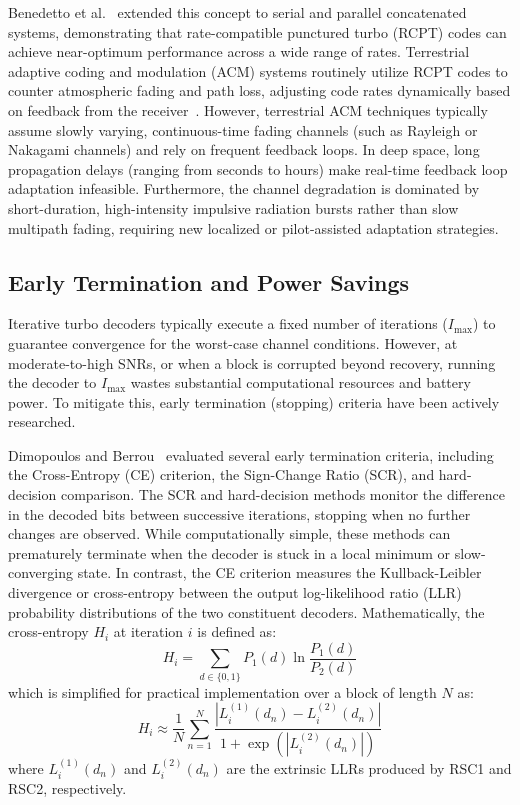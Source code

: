 \documentclass[journal,twocolumn]{IEEEtran}
\begin{document}
Benedetto et al.~\cite{benedetto1997punctured} extended this concept to serial and parallel concatenated systems, demonstrating that rate-compatible punctured turbo (RCPT) codes can achieve near-optimum performance across a wide range of rates. Terrestrial adaptive coding and modulation (ACM) systems routinely utilize RCPT codes to counter atmospheric fading and path loss, adjusting code rates dynamically based on feedback from the receiver~\cite{fazel2003adaptive}. However, terrestrial ACM techniques typically assume slowly varying, continuous-time fading channels (such as Rayleigh or Nakagami channels) and rely on frequent feedback loops. In deep space, long propagation delays (ranging from seconds to hours) make real-time feedback loop adaptation infeasible. Furthermore, the channel degradation is dominated by short-duration, high-intensity impulsive radiation bursts rather than slow multipath fading, requiring new localized or pilot-assisted adaptation strategies.

\subsection{Early Termination and Power Savings}
Iterative turbo decoders typically execute a fixed number of iterations ($I_{\max}$) to guarantee convergence for the worst-case channel conditions. However, at moderate-to-high SNRs, or when a block is corrupted beyond recovery, running the decoder to $I_{\max}$ wastes substantial computational resources and battery power. To mitigate this, early termination (stopping) criteria have been actively researched.

Dimopoulos and Berrou~\cite{dimopoulosDET} evaluated several early termination criteria, including the Cross-Entropy (CE) criterion, the Sign-Change Ratio (SCR), and hard-decision comparison. The SCR and hard-decision methods monitor the difference in the decoded bits between successive iterations, stopping when no further changes are observed. While computationally simple, these methods can prematurely terminate when the decoder is stuck in a local minimum or slow-converging state. In contrast, the CE criterion measures the Kullback-Leibler divergence or cross-entropy between the output log-likelihood ratio (LLR) probability distributions of the two constituent decoders. Mathematically, the cross-entropy $H_i$ at iteration $i$ is defined as:
\begin{equation}
  H_i = \sum_{d \in \{0,1\}} P_1(d) \ln \frac{P_1(d)}{P_2(d)}
\end{equation}
which is simplified for practical implementation over a block of length $N$ as:
\begin{equation}
  H_i \approx \frac{1}{N} \sum_{n=1}^N \frac{|L^{(1)}_i(d_n) - L^{(2)}_i(d_n)|}{1 + \exp(|L^{(2)}_i(d_n)|)}
\end{equation}
where $L^{(1)}_i(d_n)$ and $L^{(2)}_i(d_n)$ are the extrinsic LLRs produced by RSC1 and RSC2, respectively.
\end{document}
